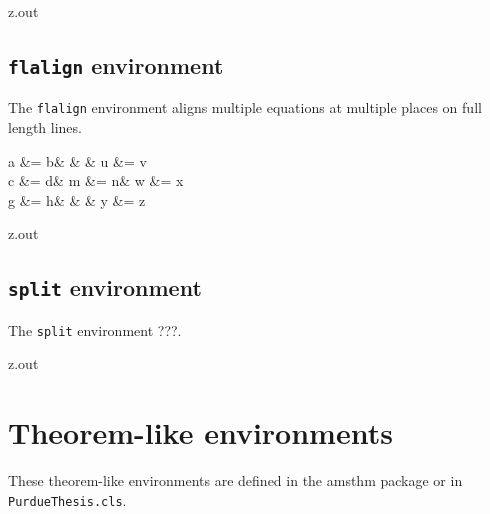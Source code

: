 \begin{VerbatimOut}{z.out}

\index{\verb+\begin{flalign}+}
\subsection{\texttt{flalign} environment}

The \verb+flalign+ environment aligns multiple equations at multiple places
on full length lines.

\begin{flalign}
  a &= b&   &   & u &= v\\
  c &= d& m &= n& w &= x\notag\\
  g &= h&   &   & y &= z
\end{flalign}
\end{VerbatimOut}

\MyIO


\begin{VerbatimOut}{z.out}

\index{\verb+\begin{split}+}
\subsection{\texttt{split} environment}

The \verb+split+ environment ???.
\end{VerbatimOut}

\MyIO
\index{\verb+\begin{split}+}


\begin{VerbatimOut}{z.out}
\section{Theorem-like environments}

These theorem-like environments are defined
in the amsthm package or in\\  %
\verb+PurdueThesis.cls+.
\end{VerbatimOut}

\MyIO


